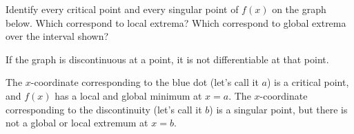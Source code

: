 \begin{Mquestion}
Identify every critical point and every singular point of $f(x)$
on the graph below. Which correspond to local extrema? Which correspond to global extrema over the interval shown?

\begin{center}\end{center}

\end{Mquestion}
\begin{hint}
If the graph is discontinuous at a point, it is not differentiable at that point.
\end{hint}
\begin{answer}
\begin{center}\end{center}
The $x$-coordinate corresponding to the blue dot (let's call it $a$) is a critical point, and $f(x)$ has a local and global minimum at $x=a$. The $x$-coordinate corresponding to the discontinuity (let's call it $b$) is a singular point, but there is not a global or local extremum at $x=b$.
\end{answer}
